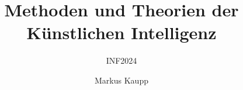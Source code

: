 
\makeatletter
{}
\makeatother
{}

\newcommand{\tinfjahr}{INF2024}

\newcommand{\TITLEIMAGE}{figures/titelbild.png}

\newcommand{\QUIZURL}{https://partici.fi/85140558}
\newcommand{\QUIZQRCODE}{figures/quiz-qr.png}
\newcommand{\QUIZIMAGE}{figures/quiz.png}

\newcommand{\FRAGENIMAGE}{figures/fragen.png}

\title{Methoden und Theorien der Künstlichen Intelligenz}
\subtitle{\tinfjahr}
\author{Markus Kaupp}

